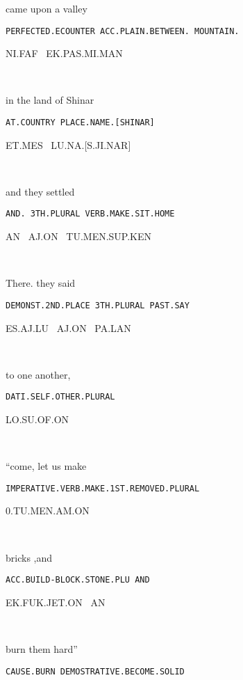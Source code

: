 {\drie 

came upon 		a valley                 

{\tt PERFECTED.ECOUNTER  	ACC.PLAIN.BETWEEN. MOUNTAIN.	}

NI.FAF~                                EK.PAS.MI.MAN 

\Atlanni\faf~\ek\pas\mi\man


\drie  

in the land          of Shinar 

{\tt AT.COUNTRY	PLACE.NAME.[SHINAR] }

ET.MES~		LU.NA.[S.JI.NAR] 

\et\mes~\lu\na{}

\drie


and 	they 		settled			 

{\tt AND.	3TH.PLURAL	VERB.MAKE.SIT.HOME	 }

AN~	AJ.ON~   TU.MEN.SUP.KEN 

\an~\aj\on~\tu\men\Atlansup\ken

\drie
  

There.			they		said 	 

{\tt DEMONST.2ND.PLACE	3TH.PLURAL	PAST.SAY }

ES.AJ.LU~		AJ.ON~		PA.LAN	 

\es\aj\lu~\period \aj\on~\pa\lan

\drie 

to one another, 			 

{\tt DATI.SELF.OTHER.PLURAL		 }

LO.SU.OF.ON 

\lo\su\of\on\
 
\drie 



  

“come, let us make   

{\tt IMPERATIVE.VERB.MAKE.1ST.REMOVED.PLURAL }

0.TU.MEN.AM.ON 

\Atlano\tu\men\am\on\

\drie 

 

bricks			,and 	 

{\tt ACC.BUILD-BLOCK.STONE.PLU 	AND		 }

EK.FUK.JET.ON~			AN 

\ek\fuk\jet\on~\an\


  

burn them			hard” 

{\tt CAUSE.BURN 			DEMOSTRATIVE.BECOME.SOLID }

}
